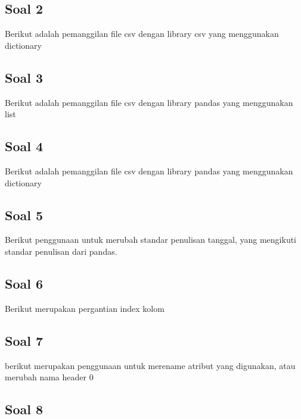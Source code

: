 \subsection{Soal 2}
Berikut adalah pemanggilan file csv dengan library csv yang menggunakan dictionary


\subsection{Soal 3}
Berikut adalah pemanggilan file csv dengan library pandas yang menggunakan list


\subsection{Soal 4}
Berikut adalah pemanggilan file csv dengan library pandas yang menggunakan dictionary


\subsection{Soal 5}
Berikut penggunaan untuk merubah standar penulisan tanggal, yang mengikuti standar penulisan dari pandas.


\subsection{Soal 6}
Berikut merupakan pergantian index kolom


\subsection{Soal 7}
berikut merupakan penggunaan untuk merename atribut yang digunakan, atau merubah nama header 0


\subsection{Soal 8}


